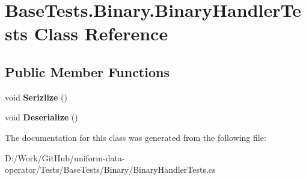 \hypertarget{class_base_tests_1_1_binary_1_1_binary_handler_tests}{}\section{Base\+Tests.\+Binary.\+Binary\+Handler\+Tests Class Reference}
\label{class_base_tests_1_1_binary_1_1_binary_handler_tests}
\subsection*{Public Member Functions}
\begin{DoxyCompactItemize}
\item 
\mbox{\label{class_base_tests_1_1_binary_1_1_binary_handler_tests_a7a80b90b70f7775abee8957780d62718}} 
void {\bfseries Serizlize} ()
\item 
\mbox{\label{class_base_tests_1_1_binary_1_1_binary_handler_tests_a3f56cf1a807a4b9a03a5ade61e24eab5}} 
void {\bfseries Deserialize} ()
\end{DoxyCompactItemize}


The documentation for this class was generated from the following file\+:\begin{DoxyCompactItemize}
\item 
D\+:/\+Work/\+Git\+Hub/uniform-\/data-\/operator/\+Tests/\+Base\+Tests/\+Binary/Binary\+Handler\+Tests.\+cs\end{DoxyCompactItemize}
